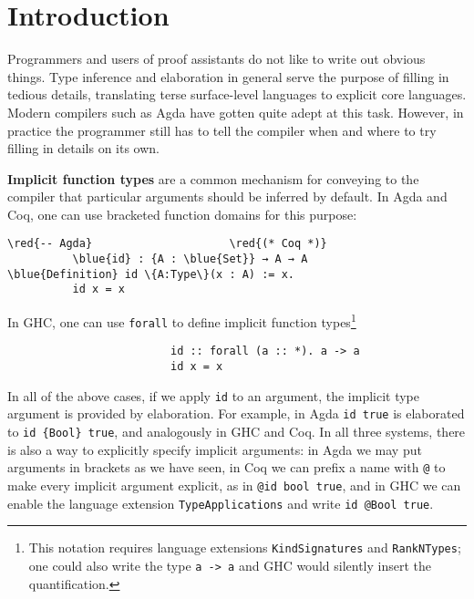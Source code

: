 \documentclass[acmsmall,review,anonymous]{acmart}\settopmatter{printfolios=true,printccs=false,printacmref=false}
\newcommand{\blue}[1]{\textcolor{blue}{#1}}
\newcommand{\red}[1]{\textcolor{red}{#1}}
\begin{document}

\maketitle


\section{Introduction}

Programmers and users of proof assistants do not like to write out obvious
things. Type inference and elaboration in general serve the purpose of filling
in tedious details, translating terse surface-level languages to explicit core
languages. Modern compilers such as Agda have gotten quite adept at this
task. However, in practice the programmer still has to tell the compiler when
and where to try filling in details on its own.

\textbf{Implicit function types} are a common mechanism for conveying to the
compiler that particular arguments should be inferred by default. In Agda and
Coq, one can use bracketed function domains for this purpose:
\begin{Verbatim}[commandchars=\\\{\}]
          \red{-- Agda}                     \red{(* Coq *)}
          \blue{id} : {A : \blue{Set}} → A → A        \blue{Definition} id \{A:Type\}(x : A) := x.
          id x = x
\end{Verbatim}
In GHC, one can use \texttt{forall} to define implicit function
types\footnote{This notation requires language extensions
  \texttt{KindSignatures} and \texttt{RankNTypes}; one could also write the type
  \texttt{a -> a} and GHC would silently insert the quantification.}
\begin{verbatim}
                         id :: forall (a :: *). a -> a
                         id x = x
\end{verbatim}

In all of the above cases, if we apply \texttt{id} to an argument, the implicit
type argument is provided by elaboration. For example, in Agda \texttt{id true}
is elaborated to \texttt{id \{Bool\} true}, and analogously in GHC and Coq. In
all three systems, there is also a way to explicitly specify implicit arguments:
in Agda we may put arguments in brackets as we have seen, in Coq we can prefix a
name with \texttt{@} to make every implicit argument explicit, as in \texttt{@id
  bool true}, and in GHC we can enable the language extension
\texttt{TypeApplications} and write \texttt{id @Bool true}.
\end{document}
